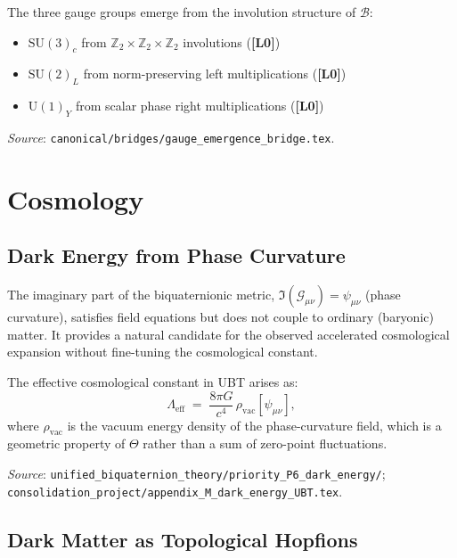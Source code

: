 \documentclass[12pt,a4paper]{article}
\newcommand{\Lzero}{\textbf{[L0]}}
\begin{document}
The three gauge groups emerge from the involution structure of $\mathcal{B}$:
\begin{itemize}
  \item $\mathrm{SU}(3)_c$ from $\mathbb{Z}_2\times\mathbb{Z}_2\times\mathbb{Z}_2$ involutions (\Lzero)
  \item $\mathrm{SU}(2)_L$ from norm-preserving left multiplications (\Lzero)
  \item $\mathrm{U}(1)_Y$ from scalar phase right multiplications (\Lzero)
\end{itemize}

\textit{Source}: \texttt{canonical/bridges/gauge\_emergence\_bridge.tex}.

\section{Cosmology}
\label{sec:cosmology}

\subsection{Dark Energy from Phase Curvature}

The imaginary part of the biquaternionic metric,
$\Im(\mathcal{G}_{\mu\nu}) = \psi_{\mu\nu}$ (phase curvature),
satisfies field equations but does not couple to ordinary (baryonic) matter.
It provides a natural candidate for the observed accelerated cosmological
expansion without fine-tuning the cosmological constant.

The effective cosmological constant in UBT arises as:
\begin{equation}
  \Lambda_{\mathrm{eff}} \;=\; \frac{8\pi G}{c^4}\,
  \rho_{\mathrm{vac}}[\psi_{\mu\nu}],
\end{equation}
where $\rho_{\mathrm{vac}}$ is the vacuum energy density of the phase-curvature
field, which is a geometric property of $\Theta$ rather than a sum of
zero-point fluctuations.

\textit{Source}: \texttt{unified\_biquaternion\_theory/priority\_P6\_dark\_energy/};
\texttt{consolidation\_project/appendix\_M\_dark\_energy\_UBT.tex}.

\subsection{Dark Matter as Topological Hopfions}
\end{document}
